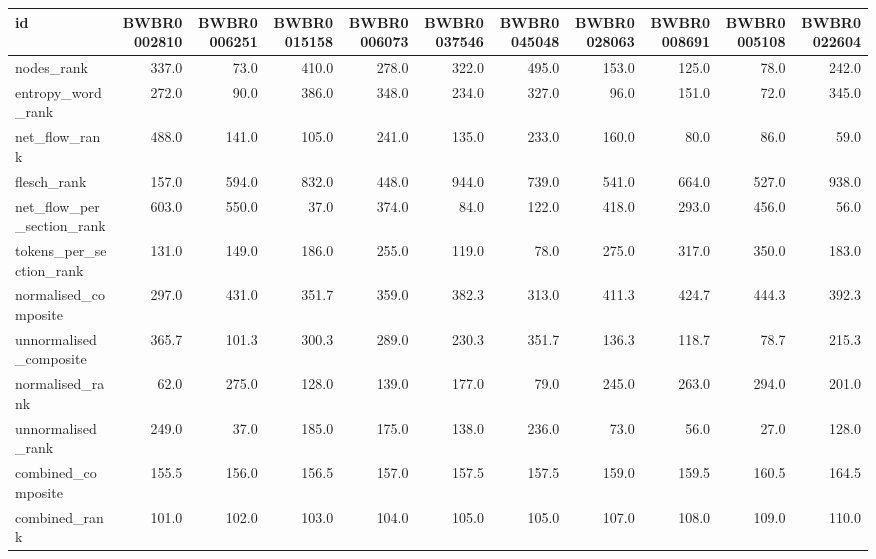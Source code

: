\begin{tabular}{lrrrrrrrrrr}
\toprule
id & BWBR0002810 & BWBR0006251 & BWBR0015158 & BWBR0006073 & BWBR0037546 & BWBR0045048 & BWBR0028063 & BWBR0008691 & BWBR0005108 & BWBR0022604 \\
\midrule
nodes\_rank & 337.0 & 73.0 & 410.0 & 278.0 & 322.0 & 495.0 & 153.0 & 125.0 & 78.0 & 242.0 \\
\cline{1-11}
entropy\_word\_rank & 272.0 & 90.0 & 386.0 & 348.0 & 234.0 & 327.0 & 96.0 & 151.0 & 72.0 & 345.0 \\
\cline{1-11}
net\_flow\_rank & 488.0 & 141.0 & 105.0 & 241.0 & 135.0 & 233.0 & 160.0 & 80.0 & 86.0 & 59.0 \\
\cline{1-11}
flesch\_rank & 157.0 & 594.0 & 832.0 & 448.0 & 944.0 & 739.0 & 541.0 & 664.0 & 527.0 & 938.0 \\
\cline{1-11}
net\_flow\_per\_section\_rank & 603.0 & 550.0 & 37.0 & 374.0 & 84.0 & 122.0 & 418.0 & 293.0 & 456.0 & 56.0 \\
\cline{1-11}
tokens\_per\_section\_rank & 131.0 & 149.0 & 186.0 & 255.0 & 119.0 & 78.0 & 275.0 & 317.0 & 350.0 & 183.0 \\
\cline{1-11}
normalised\_composite & 297.0 & 431.0 & 351.7 & 359.0 & 382.3 & 313.0 & 411.3 & 424.7 & 444.3 & 392.3 \\
\cline{1-11}
unnormalised\_composite & 365.7 & 101.3 & 300.3 & 289.0 & 230.3 & 351.7 & 136.3 & 118.7 & 78.7 & 215.3 \\
\cline{1-11}
normalised\_rank & 62.0 & 275.0 & 128.0 & 139.0 & 177.0 & 79.0 & 245.0 & 263.0 & 294.0 & 201.0 \\
\cline{1-11}
unnormalised\_rank & 249.0 & 37.0 & 185.0 & 175.0 & 138.0 & 236.0 & 73.0 & 56.0 & 27.0 & 128.0 \\
\cline{1-11}
combined\_composite & 155.5 & 156.0 & 156.5 & 157.0 & 157.5 & 157.5 & 159.0 & 159.5 & 160.5 & 164.5 \\
\cline{1-11}
combined\_rank & 101.0 & 102.0 & 103.0 & 104.0 & 105.0 & 105.0 & 107.0 & 108.0 & 109.0 & 110.0 \\
\cline{1-11}
\bottomrule
\end{tabular}
